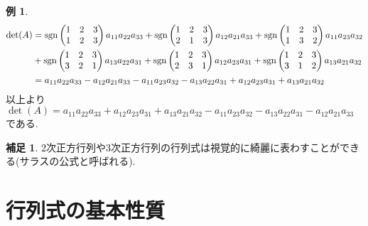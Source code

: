\documentclass[dvipdfmx,a4paper,11pt]{article}
\newcommand{\sgn}{{\rm sgn}}
\theoremstyle{definition}
\newtheorem{exa}[thm]{例}
\newtheorem{rema}[thm]{補足}
\begin{document}
\begin{exa}
  \begin{align*}
  \det(A) 
  &= 
  \sgn \begin{pmatrix}
1& 2 &3\\
1& 2 &3\\
 \end{pmatrix}
 a_{11}a_{22}a_{33}
 +
   \sgn \begin{pmatrix}
1& 2 &3\\
2& 1 &3\\
 \end{pmatrix} 
 a_{12}a_{21}a_{33}
 +
\sgn \begin{pmatrix}
1& 2 &3\\
1& 3 &2\\
 \end{pmatrix} 
 a_{11}a_{23}a_{32} 
  \\%
  &+
\sgn  \begin{pmatrix}
1& 2 &3\\
3& 2 &1\\
 \end{pmatrix}
 a_{13}a_{22}a_{31} 
 +
\sgn  \begin{pmatrix}
1& 2 &3\\
2& 3 &1\\
 \end{pmatrix}
 a_{12}a_{23}a_{31} 
  +
\sgn   \begin{pmatrix}
1& 2 &3\\
3& 1 &2\\
 \end{pmatrix}
 a_{13}a_{21}a_{32} 
 \\%
   &= a_{11}a_{22}a_{33}- a_{12}a_{21}a_{33}- a_{11}a_{23}a_{32} 
   - a_{13}a_{22}a_{31}  + a_{12}a_{23}a_{31}  +  a_{13}a_{21}a_{32} 
  \end{align*}
  以上より
  $
 \det(A)= 
 a_{11}a_{22}a_{33}+ a_{12}a_{23}a_{31}  +  a_{13}a_{21}a_{32} 
- a_{11}a_{23}a_{32}     - a_{13}a_{22}a_{31}  - a_{12}a_{21}a_{33}
  $
  である.
\end{exa}
\begin{rema}
2次正方行列や3次正方行列の行列式は視覚的に綺麗に表わすことができる(サラスの公式と呼ばれる).
\end{rema}

\section{行列式の基本性質}
\end{document}
